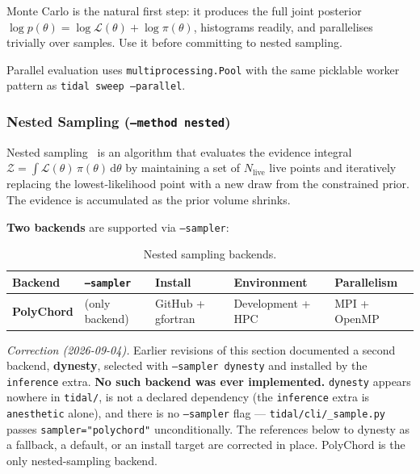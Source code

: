 Monte Carlo is the natural first step: it produces the full joint posterior
$\log p(\theta) = \log\mathcal{L}(\theta) + \log\pi(\theta)$, histograms readily,
and parallelises trivially over samples.  Use it before committing to
nested sampling.

Parallel evaluation uses \texttt{multiprocessing.Pool} with the same
picklable worker pattern as \texttt{tidal sweep --parallel}.

\subsubsection{Nested Sampling (\texttt{--method nested})}
\label{sec:inference-nested}

Nested sampling~\cite{skilling2004nested} is an algorithm that evaluates the
evidence integral $\mathcal{Z} = \int \mathcal{L}(\theta)\,\pi(\theta)\,\mathrm{d}\theta$
by maintaining a set of $N_\mathrm{live}$ live points and iteratively
replacing the lowest-likelihood point with a new draw from the constrained
prior.  The evidence is accumulated as the prior volume shrinks.

\textbf{Two backends} are supported via \texttt{--sampler}:

\begin{table}[htbp]
\centering
\caption{Nested sampling backends.}
\label{tab:nested-backends}
\begin{tabular}{@{}lllll@{}}
\toprule
Backend     & \texttt{--sampler} & Install & Environment & Parallelism \\
\midrule
\textbf{PolyChord} & (only backend) & GitHub + gfortran & Development + HPC & MPI + OpenMP \\
\bottomrule
\end{tabular}
\end{table}

\emph{Correction (2026-09-04).} Earlier revisions of this section documented a
second backend, \textbf{dynesty}, selected with \texttt{--sampler dynesty} and
installed by the \texttt{inference} extra.  \textbf{No such backend was ever
implemented.}  \texttt{dynesty} appears nowhere in \texttt{tidal/}, is not a
declared dependency (the \texttt{inference} extra is \texttt{anesthetic} alone),
and there is no \texttt{--sampler} flag --- \texttt{tidal/cli/\_sample.py} passes
\texttt{sampler="polychord"} unconditionally.  The references below to dynesty as
a fallback, a default, or an install target are corrected in place.  PolyChord is
the only nested-sampling backend.

